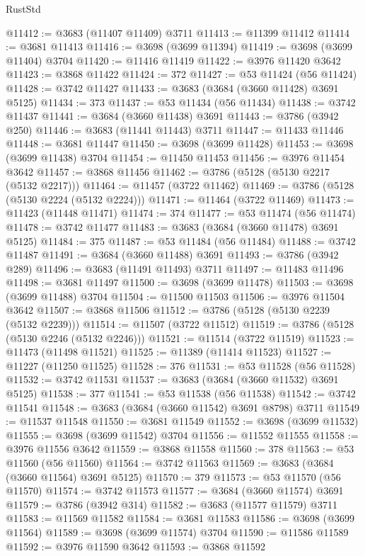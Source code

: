 \begin{lexlean}{RustStd}
\begin{coremodule}
{\begin{coremodule}
{{{{{{{{{{{{{{{{{{{{{{{{{{{{{{{{{{{{{{{{{{{{{{{@11412 := @3683 (@11407 @11409) @3711
@11413 := @11399 @11412
@11414 := @3681 @11413
@11416 := @3698 (@3699 @11394)
@11419 := @3698 (@3699 @11404) @3704
@11420 := @11416 @11419
@11422 := @3976 @11420 @3642
@11423 := @3868 @11422
@11424 := 372
@11427 := @53 @11424 (@56 @11424)
@11428 := @3742 @11427
@11433 := @3683 (@3684 (@3660 @11428) @3691 @5125)
@11434 := 373
@11437 := @53 @11434 (@56 @11434)
@11438 := @3742 @11437
@11441 := @3684 (@3660 @11438) @3691
@11443 := @3786 (@3942 @250)
@11446 := @3683 (@11441 @11443) @3711
@11447 := @11433 @11446
@11448 := @3681 @11447
@11450 := @3698 (@3699 @11428)
@11453 := @3698 (@3699 @11438) @3704
@11454 := @11450 @11453
@11456 := @3976 @11454 @3642
@11457 := @3868 @11456
@11462 := @3786 (@5128 (@5130 @2217 (@5132 @2217)))
@11464 := @11457 (@3722 @11462)
@11469 := @3786 (@5128 (@5130 @2224 (@5132 @2224)))
@11471 := @11464 (@3722 @11469)
@11473 := @11423 (@11448 @11471)
@11474 := 374
@11477 := @53 @11474 (@56 @11474)
@11478 := @3742 @11477
@11483 := @3683 (@3684 (@3660 @11478) @3691 @5125)
@11484 := 375
@11487 := @53 @11484 (@56 @11484)
@11488 := @3742 @11487
@11491 := @3684 (@3660 @11488) @3691
@11493 := @3786 (@3942 @289)
@11496 := @3683 (@11491 @11493) @3711
@11497 := @11483 @11496
@11498 := @3681 @11497
@11500 := @3698 (@3699 @11478)
@11503 := @3698 (@3699 @11488) @3704
@11504 := @11500 @11503
@11506 := @3976 @11504 @3642
@11507 := @3868 @11506
@11512 := @3786 (@5128 (@5130 @2239 (@5132 @2239)))
@11514 := @11507 (@3722 @11512)
@11519 := @3786 (@5128 (@5130 @2246 (@5132 @2246)))
@11521 := @11514 (@3722 @11519)
@11523 := @11473 (@11498 @11521)
@11525 := @11389 (@11414 @11523)
@11527 := @11227 (@11250 @11525)
@11528 := 376
@11531 := @53 @11528 (@56 @11528)
@11532 := @3742 @11531
@11537 := @3683 (@3684 (@3660 @11532) @3691 @5125)
@11538 := 377
@11541 := @53 @11538 (@56 @11538)
@11542 := @3742 @11541
@11548 := @3683 (@3684 (@3660 @11542) @3691 @8798) @3711
@11549 := @11537 @11548
@11550 := @3681 @11549
@11552 := @3698 (@3699 @11532)
@11555 := @3698 (@3699 @11542) @3704
@11556 := @11552 @11555
@11558 := @3976 @11556 @3642
@11559 := @3868 @11558
@11560 := 378
@11563 := @53 @11560 (@56 @11560)
@11564 := @3742 @11563
@11569 := @3683 (@3684 (@3660 @11564) @3691 @5125)
@11570 := 379
@11573 := @53 @11570 (@56 @11570)
@11574 := @3742 @11573
@11577 := @3684 (@3660 @11574) @3691
@11579 := @3786 (@3942 @314)
@11582 := @3683 (@11577 @11579) @3711
@11583 := @11569 @11582
@11584 := @3681 @11583
@11586 := @3698 (@3699 @11564)
@11589 := @3698 (@3699 @11574) @3704
@11590 := @11586 @11589
@11592 := @3976 @11590 @3642
@11593 := @3868 @11592
}}}}}}}}}}}}}}}}}}}}}}}}}}}}}}}}}}}}}}}}}}}}}}}
\end{coremodule}}
\end{coremodule}
\end{lexlean}
